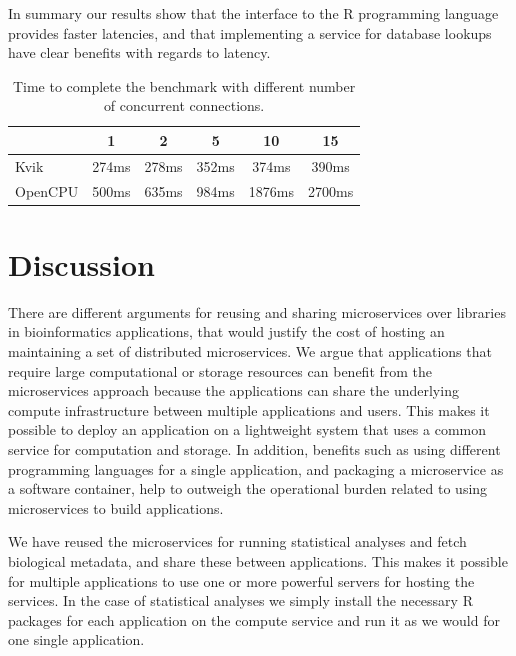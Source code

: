 In summary our results show that the interface to the R programming language
provides faster latencies, and that implementing a service for database lookups
have clear benefits with regards to latency. 

\begin{table}[h]
    \caption{Time to complete the benchmark with different number of
    concurrent connections.}
    \begin{tabular}{| l | c | c | c | c | c | }
        \hline 
       & 1 & 2 & 5 & 10 & 15 \\ 
      \hline			
      Kvik & 274ms & 278ms & 352ms & 374ms & 390ms\\
      \hline
      OpenCPU & 500ms & 635ms & 984ms & 1876ms & 2700ms\\
      \hline  
    \end{tabular}
\label{kvikopencpucomparison}
\end{table} 

\section{Discussion}
There are different arguments for reusing and sharing microservices over
libraries in bioinformatics applications, that would justify the cost of hosting
an maintaining a set of distributed microservices.  We argue that applications
that require large computational or storage resources can benefit from the
microservices approach because the applications can share the underlying compute
infrastructure between multiple applications and users.  This makes it possible
to deploy an application on a lightweight system that uses a common service for
computation and storage. In addition, benefits such as using different
programming languages for a single application, and packaging a microservice as
a software container, help to outweigh the operational burden related to using
microservices to build applications. 

We have reused the microservices for running statistical analyses and
fetch biological metadata, and share these between applications. This makes it
possible for multiple applications to use one or more powerful servers for
hosting the services. In the case of statistical analyses we simply install the
necessary R packages for each application on the compute service and run it as
we would for one single application. 

